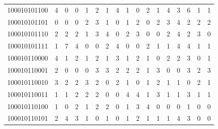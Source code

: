 \documentclass[10pt,a4paper]{article}
\begin{document}
\begin{longtable}{ |c|c|c|c|c|c|c|c|c|c|c|c|c|c|c|c|c| }
    100010101100              & 4                            & 0                                & 0                            & 1                              & 2   & 1   & 4   & 1   & 0   & 2   & 1   & 4   & 3   & 6   & 1   & 1   \\
    100010101101              & 0                            & 0                                & 0                            & 2                              & 3   & 1   & 0   & 1   & 2   & 0   & 2   & 3   & 4   & 2   & 2   & 2   \\
    100010101110              & 2                            & 2                                & 2                            & 1                              & 3   & 4   & 0   & 2   & 3   & 0   & 0   & 2   & 4   & 2   & 3   & 0   \\
    100010101111              & 1                            & 7                                & 4                            & 0                              & 0   & 2   & 4   & 0   & 0   & 2   & 1   & 1   & 4   & 4   & 1   & 1   \\
    100010110000              & 4                            & 1                                & 2                            & 1                              & 2   & 1   & 3   & 1   & 2   & 1   & 0   & 2   & 2   & 3   & 0   & 1   \\
    100010110001              & 2                            & 0                                & 0                            & 0                              & 3   & 3   & 2   & 2   & 2   & 1   & 3   & 0   & 0   & 3   & 2   & 3   \\
    100010110010              & 3                            & 2                                & 2                            & 3                              & 2   & 0   & 2   & 1   & 0   & 1   & 2   & 1   & 1   & 0   & 2   & 1   \\
    100010110011              & 1                            & 1                                & 2                            & 2                              & 2   & 0   & 0   & 4   & 4   & 1   & 3   & 1   & 1   & 3   & 1   & 1   \\
    100010110100              & 1                            & 0                                & 2                            & 1                              & 2   & 2   & 0   & 1   & 3   & 4   & 0   & 0   & 0   & 1   & 0   & 0   \\
    100010110101              & 2                            & 4                                & 3                            & 1                              & 0   & 1   & 0   & 1   & 2   & 1   & 1   & 1   & 4   & 3   & 0   & 0   \\

\end{longtable}
\end{document}
